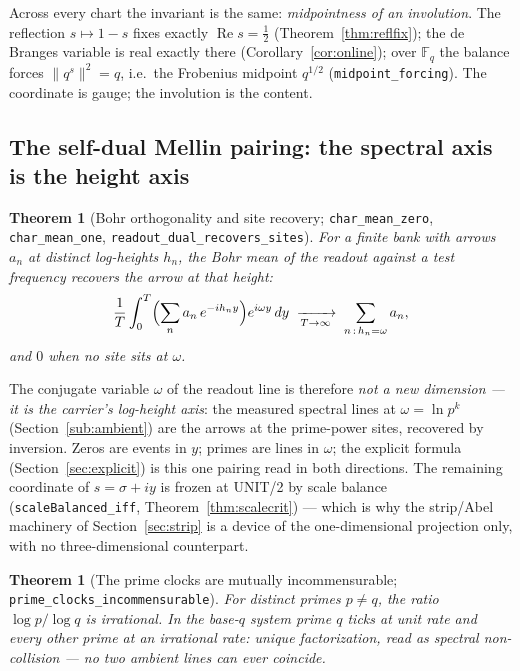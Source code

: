 \documentclass[11pt]{article}
\newtheorem{theorem}[definition]{Theorem}
\DeclareMathOperator{\Ree}{Re}
\newcommand{\code}[1]{\texttt{#1}}
\begin{document}
Across every chart the invariant is the same: \emph{midpointness of an involution}.  The
reflection $s\mapsto1-s$ fixes exactly $\Ree s=\tfrac12$ (Theorem~\ref{thm:reflfix}); the de
Branges variable is real exactly there (Corollary~\ref{cor:online}); over $\mathbb{F}_q$ the balance
forces $\|q^{s}\|^2=q$, i.e.\ the Frobenius midpoint $q^{1/2}$ (\code{midpoint\_forcing}).  The
coordinate is gauge; the involution is the content.

\subsection{The self-dual Mellin pairing: the spectral axis is the height axis}

\begin{theorem}[Bohr orthogonality and site recovery; \code{char\_mean\_zero}, \code{char\_mean\_one}, \code{readout\_dual\_recovers\_sites}]\label{thm:selfdual}
For a finite bank with arrows $a_n$ at distinct log-heights $h_n$, the Bohr mean of the readout
against a test frequency recovers the arrow at that height:
\[
  \frac1T\int_0^T\Bigl(\sum_n a_n\,e^{-ih_ny}\Bigr)e^{i\omega y}\,dy
  \;\xrightarrow[T\to\infty]{}\;\sum_{n\,:\,h_n=\omega}a_n ,
\]
and $0$ when no site sits at $\omega$.
\end{theorem}

The conjugate variable $\omega$ of the readout line is therefore \emph{not a new dimension --- it
is the carrier's log-height axis}: the measured spectral lines at $\omega=\ln p^{k}$
(Section~\ref{sub:ambient}) are the arrows at the prime-power sites, recovered by inversion.
Zeros are events in $y$; primes are lines in $\omega$; the explicit formula
(Section~\ref{sec:explicit}) is this one pairing read in both directions.  The remaining
coordinate of $s=\sigma+iy$ is frozen at UNIT/2 by scale balance (\code{scaleBalanced\_iff},
Theorem~\ref{thm:scalecrit}) --- which is why the strip/Abel machinery of Section~\ref{sec:strip}
is a device of the one-dimensional projection only, with no three-dimensional counterpart.

\begin{theorem}[The prime clocks are mutually incommensurable; \code{prime\_clocks\_incommensurable}]\label{thm:incomm}
For distinct primes $p\neq q$, the ratio $\log p/\log q$ is irrational.  In the base-$q$ system
prime $q$ ticks at unit rate and every other prime at an irrational rate: unique factorization,
read as spectral non-collision --- no two ambient lines can ever coincide.
\end{theorem}
\end{document}
